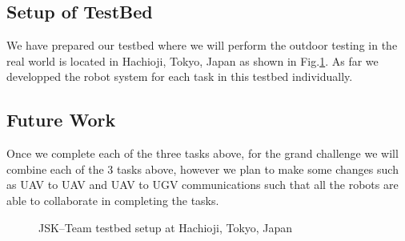 \documentclass{standalone}
\begin{document}
\subsection{Setup of TestBed}

We have prepared our testbed where we will perform the outdoor testing in the real world is located in Hachioji, Tokyo, Japan as shown in Fig.\ref{fig:objects}. As far we developped the robot system for each task in this testbed individually. 

 \subsection{Future Work}
 Once we complete each of the three tasks above, for the grand challenge we will combine each of the 3 tasks above, however we plan to make some changes such as UAV to UAV and UAV to UGV communications such that all the robots are able to collaborate in completing the tasks.
 
\begin{figure}[h]
   \newcommand \ilenght{0.1}
   \newcommand \iheight{2.0in}
   \newcommand \iwidth{0.46\textwidth}
   \centering
   \hspace{1.1em}%
   \hspace{1.1em}%
   \hspace{1.1em}%
   \hspace{1.1em}%
   \caption{JSK--Team testbed setup at Hachioji, Tokyo, Japan}
   \label{fig:objects}
 \end{figure}
\end{document}
